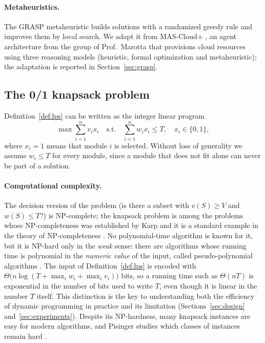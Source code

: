 \paragraph{Metaheuristics.} The GRASP metaheuristic \cite{feo1995grasp} builds solutions with a randomized greedy rule and improves them by local search. We adapt it from MAS-Cloud+ \cite{mendes2024mascloud}, an agent architecture from the group of Prof.\ Marotta that provisions cloud resources using three reasoning models (heuristic, formal optimization and metaheuristic); the adaptation is reported in Section~\ref{sec:grasp}.

\subsection{The 0/1 knapsack problem}\label{sec:knapsack}

Definition~\ref{def:lps} can be written as the integer linear program
\begin{equation}
\max \sum_{i=1}^{n} v_i x_i \quad \text{s.t.}\quad \sum_{i=1}^{n} w_i x_i \le T,\quad x_i \in \{0,1\},
\label{eq:ilp}
\end{equation}
where $x_i=1$ means that module $i$ is selected. Without loss of generality we assume $w_i \le T$ for every module, since a module that does not fit alone can never be part of a solution.

\paragraph{Computational complexity.} The decision version of the problem (is there a subset with $v(S)\ge V$ and $w(S)\le T$?) is NP-complete; the knapsack problem is among the problems whose NP-completeness was established by Karp \cite{karp1972} and it is a standard example in the theory of NP-completeness \cite{garey1979}. No polynomial-time algorithm is known for it, but it is NP-hard only in the \emph{weak} sense: there are algorithms whose running time is polynomial in the \emph{numeric value} of the input, called pseudo-polynomial algorithms \cite{garey1979,kellerer2004}. The input of Definition~\ref{def:lps} is encoded with $\Theta\big(n \log(T+\max_i w_i+\max_i v_i)\big)$ bits, so a running time such as $\Theta(nT)$ is exponential in the number of bits used to write $T$, even though it is linear in the number $T$ itself. This distinction is the key to understanding both the efficiency of dynamic programming in practice and its limitation (Sections~\ref{sec:design} and~\ref{sec:experiments}). Despite its NP-hardness, many knapsack instances are easy for modern algorithms, and Pisinger studies which classes of instances remain hard \cite{pisinger2005}.

